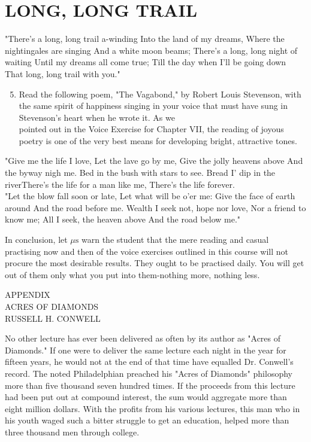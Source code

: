 \documentclass[10pt]{article}
\begin{document}
\section*{LONG, LONG TRAIL}
\begin{displayquote}
"There's a long, long trail a-winding Into the land of my dreams, Where the nightingales are singing And a white moon beams; There's a long, long night of waiting Until my dreams all come true; Till the day when I'll be going down That long, long trail with you."
\end{displayquote}

\begin{enumerate}
  \setcounter{enumi}{4}
  \item Read the following poem, "The Vagabond," by Robert Louis Stevenson, with the same spirit of happiness singing in your voice that must have sung in Stevenson's heart when he wrote it. As we\\
pointed out in the Voice Exercise for Chapter VII, the reading of joyous poetry is one of the very best means for developing bright, attractive tones.
\end{enumerate}

\begin{displayquote}
"Give me the life I love, Let the lave go by me, Give the jolly heavens above And the byway nigh me. Bed in the bush with stars to see. Bread I' dip in the riverThere's the life for a man like me, There's the life forever.\\
"Let the blow fall soon or late, Let what will be o'er me: Give the face of earth around And the road before me. Wealth I seek not, hope nor love, Nor a friend to know me; All I seek, the heaven above And the road below me."
\end{displayquote}

In conclusion, let $\mu \mathrm{s}$ warn the student that the mere reading and casual practising now and then of the voice exercises outlined in this course will not procure the most desirable results. They ought to be practised daily. You will get out of them only what you put into them-nothing more, nothing less.

APPENDIX\\
ACRES OF DIAMONDS\\
RUSSELL H. CONWELL

No other lecture has ever been delivered as often by its author as "Acres of Diamonds." If one were to deliver the same lecture each night in the year for fifteen years, he would not at the end of that time have equalled Dr. Conwell's record. The noted Philadelphian preached his "Acres of Diamonds" philosophy more than five thousand seven hundred times. If the proceeds from this lecture had been put out at compound interest, the sum would aggregate more than eight million dollars. With the profits from his various lectures, this man who in his youth waged such a bitter struggle to get an education, helped more than three thousand men through college.
\end{document}

